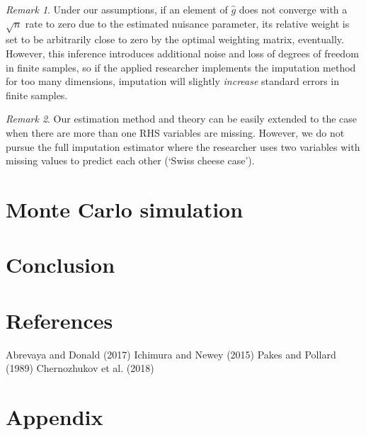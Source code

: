 \documentclass{article}
\theoremstyle{definition}
\theoremstyle{remark}
\newtheorem{remark}{Remark}
\begin{document}
\begin{remark}
	Under our assumptions, if an element of $\hat{g}$ does not converge with a $\sqrt{n}$ rate to zero due to the estimated nuisance parameter, its relative weight is set to be arbitrarily close to zero by the optimal weighting matrix, eventually. However, this inference introduces additional noise and loss of degrees of freedom in finite samples, so if the applied researcher implements the imputation method for too many dimensions, imputation will slightly \textit{increase} standard errors in finite samples. 
\end{remark}

\begin{remark}
	Our estimation method and theory can be easily extended to the case when there are more than one RHS variables are missing. However, we do not pursue the full imputation estimator where the researcher uses two variables with missing values to predict each other (`Swiss cheese case').
\end{remark}

\section{Monte Carlo simulation}




\section{Conclusion}

\section{References}

Abrevaya and Donald (2017)
Ichimura and Newey (2015)
Pakes and Pollard (1989)
Chernozhukov et al. (2018)

\section{Appendix}
\end{document}
